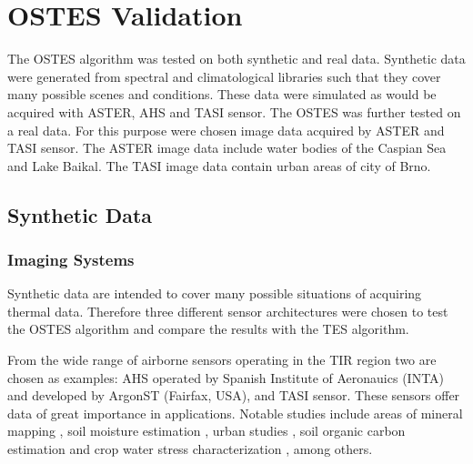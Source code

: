 \chapter{OSTES Validation}
\label{chap:OSTESValid}

The OSTES algorithm was tested on both synthetic and real data. Synthetic data were generated from spectral and climatological  libraries such that they cover many possible scenes and conditions. These data were simulated as would be acquired with ASTER, AHS and TASI sensor. The OSTES was further tested on a real data. For this purpose were chosen image data acquired by ASTER and TASI sensor. The ASTER image data include water bodies of the Caspian Sea and Lake Baikal. The TASI image data contain urban areas of city of Brno. 

\section{Synthetic Data}

\subsection*{Imaging Systems}

Synthetic data are intended to cover many possible situations of acquiring thermal data. Therefore three different sensor architectures were chosen to test the OSTES algorithm and compare the results with the TES algorithm.

From the wide range of airborne sensors operating in the TIR region two are chosen as examples: AHS operated by Spanish Institute of Aeronauics (INTA) and developed by ArgonST (Fairfax, USA), and TASI sensor. These sensors offer data of great importance in applications. Notable studies include areas of
mineral mapping \cite{NK14}, 
soil moisture estimation \cite{SF12}, 
urban studies \cite{SO12},
soil organic carbon estimation \cite{PC14} and
crop water stress characterization \cite{PP12},
among others.

